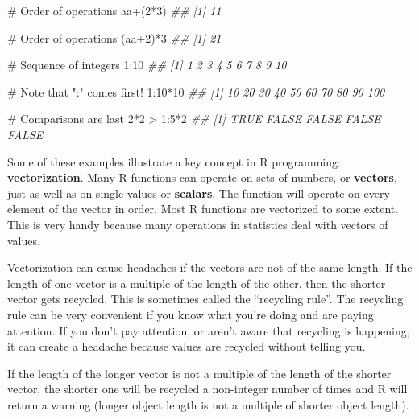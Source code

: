 \documentclass[
  13,
  letterpaper,
]{report}
\newenvironment{Shaded}{\begin{snugshade}}{\end{snugshade}}
\newcommand{\CommentTok}[1]{\textcolor[rgb]{0.37,0.37,0.37}{#1}}
\newcommand{\DecValTok}[1]{\textcolor[rgb]{0.68,0.00,0.00}{#1}}
\newcommand{\DocumentationTok}[1]{\textcolor[rgb]{0.37,0.37,0.37}{\textit{#1}}}
\newcommand{\NormalTok}[1]{\textcolor[rgb]{0.00,0.23,0.31}{#1}}
\newcommand{\SpecialCharTok}[1]{\textcolor[rgb]{0.37,0.37,0.37}{#1}}
\begin{document}
\begin{Shaded}
\begin{Highlighting}[]
\CommentTok{\# Order of operations}
\NormalTok{aa}\SpecialCharTok{+}\NormalTok{(}\DecValTok{2}\SpecialCharTok{*}\DecValTok{3}\NormalTok{)        }
\DocumentationTok{\#\# [1] 11}

\CommentTok{\# Order of operations}
\NormalTok{(aa}\SpecialCharTok{+}\DecValTok{2}\NormalTok{)}\SpecialCharTok{*}\DecValTok{3}        
\DocumentationTok{\#\# [1] 21}

\CommentTok{\# Sequence of integers}
\DecValTok{1}\SpecialCharTok{:}\DecValTok{10}            
\DocumentationTok{\#\#  [1]  1  2  3  4  5  6  7  8  9 10}

\CommentTok{\# Note that ":" comes first!}
\DecValTok{1}\SpecialCharTok{:}\DecValTok{10}\SpecialCharTok{*}\DecValTok{10}         
\DocumentationTok{\#\#  [1]  10  20  30  40  50  60  70  80  90 100}

\CommentTok{\# Comparisons are last}
\DecValTok{2}\SpecialCharTok{*}\DecValTok{2} \SpecialCharTok{\textgreater{}} \DecValTok{1}\SpecialCharTok{:}\DecValTok{5}\SpecialCharTok{*}\DecValTok{2}     
\DocumentationTok{\#\# [1]  TRUE FALSE FALSE FALSE FALSE}
\end{Highlighting}
\end{Shaded}

Some of these examples illustrate a key concept in R programming:
\textbf{vectorization}. Many R functions can operate on sets of numbers,
or \textbf{vectors}, just as well as on single values or
\textbf{scalars}. The function will operate on every element of the
vector in order. Most R functions are vectorized to some extent. This is
very handy because many operations in statistics deal with vectors of
values.

Vectorization can cause headaches if the vectors are not of the same
length. If the length of one vector is a multiple of the length of the
other, then the shorter vector gets recycled. This is sometimes called
the ``recycling rule''. The recycling rule can be very convenient if you
know what you're doing and are paying attention. If you don't pay
attention, or aren't aware that recycling is happening, it can create a
headache because values are recycled without telling you.

If the length of the longer vector is not a multiple of the length of
the shorter vector, the shorter one will be recycled a non-integer
number of times and R will return a warning (longer object length is not
a multiple of shorter object length).
\end{document}
